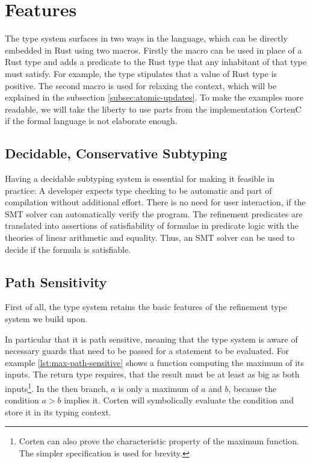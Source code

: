 \documentclass[twoside, english, final]{sdqthesis}
\theoremstyle{definition}
\begin{document}
\section{Features}


The type system surfaces in two ways in the language, which can be directly embedded in Rust using two macros. Firstly the macro  can be used in place of a Rust type and adds a predicate to the Rust type that any inhabitant of that type must satisfy. For example, the type  stipulates that a value of Rust type  is positive. The second macro  is used for relaxing the context, which will be explained in the subsection \ref{subsec:atomic-updates}.
To make the examples more readable, we will take the liberty to use parts from the implementation CortenC if the formal language is not elaborate enough.

\subsection{Decidable, Conservative Subtyping}

Having a decidable subtyping system is essential for making it feasible in practice: A developer expects type checking to be automatic and part of compilation without additional effort. There is no need for user interaction, if the SMT solver can automatically verify the program.
The refinement predicates are translated into assertions of satisfiability of formulae in predicate logic with the theories of linear arithmetic and equality. Thus, an SMT solver can be used to decide if the formula is satisfiable.


\label{subsec:path-sensitivify}\subsection{Path Sensitivity}

First of all, the type system retains the basic features of the refinement type system we build upon.

In particular that it is path sensitive, meaning that the type system is aware of necessary guards that need to be passed for a statement to be evaluated. For example \cref{lst:max-path-sensitive} shows a function computing the maximum of its inputs. 
The return type requires, that the result must be at least as big as both inputs\footnote{Corten can also prove the characteristic property of the maximum function. The simpler specification is used for brevity.}. In the then branch, $a$ is only a maximum of $a$ and $b$, because the condition $a > b$ implies it. Corten will symbolically evaluate the condition and store it in its typing context.
\end{document}
